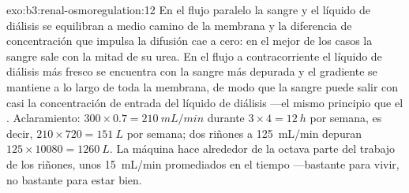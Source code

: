 \begin{solution}{exo:b3:renal-osmoregulation:12}
En el flujo paralelo la sangre y el líquido de diálisis se equilibran a
medio camino de la membrana y la diferencia de concentración que
impulsa la difusión cae a cero: en el mejor de los casos la sangre sale
con la mitad de su urea. En el flujo a contracorriente el líquido de
diálisis más fresco se encuentra con la sangre más depurada y el
gradiente se mantiene a lo largo de toda la membrana, de modo que la
sangre puede salir con casi la concentración de entrada del líquido de
diálisis ---el mismo principio que el . Aclaramiento: $300\times 0.7 =
\qty{210}{mL/min}$ durante $3\times 4 = \qty{12}{h}$ por semana, es
decir, $210\times 720 = \qty{151}{L}$ por semana; dos riñones a
\qty{125}{mL/min} depuran $125\times\num{10080} = \qty{1260}{L}$. La
máquina hace alrededor de la octava parte del trabajo de los riñones,
unos \qty{15}{mL/min} promediados en el tiempo ---bastante para vivir,
no bastante para estar bien.
\end{solution}


